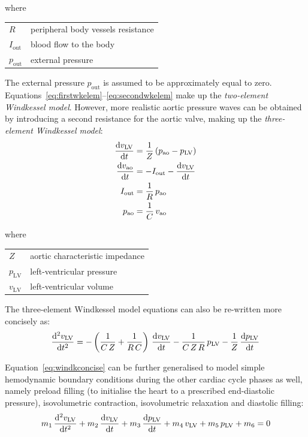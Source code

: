 \noindent
where

\vspace{0.2cm}
\begin{tabular}{ll}
    $R$ & peripheral body vessels resistance \\
    $I_{\textrm{out}}$ & blood flow to the body \\
    $p_{\textrm{out}}$ & external pressure \\
\end{tabular}

\vspace{0.5cm}
\noindent
The external pressure $p_{\textrm{out}}$ is assumed to be approximately equal to zero. Equations~\eqref{eq:firstwkelem}--\eqref{eq:secondwkelem} make up the \textit{two-element Windkessel model}. However, more realistic aortic pressure waves can be obtained by introducing a second resistance for the aortic valve, making up the \textit{three-element Windkessel model}:
%
\begin{align}\label{eq:windk}
    \dfrac{\mathrm{d}{v_{\textrm{LV}}}}{\mathrm{d}{t}} &= \frac{1}{Z}\,(p_{\textrm{ao}}-p_{\textrm{LV}}) \\ 
    \dfrac{\mathrm{d}{v_{\textrm{ao}}}}{\mathrm{d}{t}} &= -I_{\textrm{out}}-\dfrac{\mathrm{d}{v_{\textrm{LV}}}}{\mathrm{d}{t}} \\
    I_{\textrm{out}} &= \frac{1}{R}\,p_{\textrm{ao}} \\
    p_{\textrm{ao}} &= \frac{1}{C}\,v_{\textrm{ao}}
\end{align}

\noindent
where

\vspace{0.2cm}
\begin{tabular}{ll}
    $Z$ & aortic characteristic impedance \\
    $p_{\textrm{LV}}$ & left-ventricular pressure \\
    $v_{\textrm{LV}}$ & left-ventricular volume
\end{tabular}

\vspace{0.5cm}
\noindent
The three-element Windkessel model equations can also be re-written more concisely as:
%
\begin{equation}\label{eq:windkconcise}
    \dfrac{\mathrm{d}^2{v_{\textrm{LV}}}}{\mathrm{d}{t}^2} = -\left(\frac{1}{C\,Z}+\frac{1}{R\,C}\right)\,\dfrac{\mathrm{d}{v_{\textrm{LV}}}}{\mathrm{d}{t}}-\frac{1}{C\,Z\,R}\,p_{\textrm{LV}}-\frac{1}{Z}\,\dfrac{\mathrm{d}{p_{\textrm{LV}}}}{\mathrm{d}{t}}
\end{equation}

\vspace{0.2cm}
Equation~\eqref{eq:windkconcise} can be further generalised to model simple hemodynamic boundary conditions during the other cardiac cycle phases as well, namely preload filling (to initialise the heart to a prescribed end-diastolic pressure), isovolumetric contraction, isovolumetric relaxation and diastolic filling:
%
\begin{equation}\label{eq:windkgeneral}
    m_1\,\dfrac{\mathrm{d}^2{v_{\textrm{LV}}}}{\mathrm{d}{t}^2} + m_2\,\dfrac{\mathrm{d}{v_{\textrm{LV}}}}{\mathrm{d}{t}} + m_3\,\dfrac{\mathrm{d}{p_{\textrm{LV}}}}{\mathrm{d}{t}} + m_4\,v_{\textrm{LV}} + m_5\,p_{\textrm{LV}} +  m_6 = 0
\end{equation}

